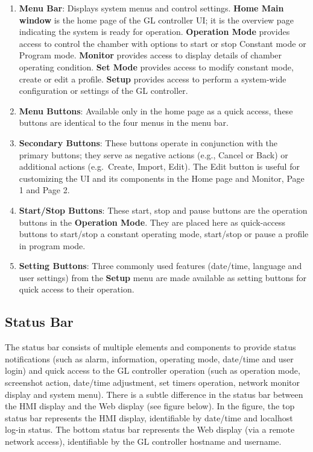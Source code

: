 \begin{enumerate}
\def\labelenumi{\arabic{enumi}.}
\tightlist
\item
  \textbf{Menu Bar}: Displays system menus and control settings.
  \textbf{Home Main window} is the home page of the GL controller UI; it
  is the overview page indicating the system is ready for operation.
  \textbf{Operation Mode} provides access to control the chamber with
  options to start or stop Constant mode or Program mode.
  \textbf{Monitor} provides access to display details of chamber
  operating condition. \textbf{Set Mode} provides access to modify
  constant mode, create or edit a profile. \textbf{Setup} provides
  access to perform a system-wide configuration or settings of the GL
  controller.\\
\item
  \textbf{Menu Buttons}: Available only in the home page as a quick
  access, these buttons are identical to the four menus in the menu
  bar.\\
\item
  \textbf{Secondary Buttons}: These buttons operate in conjunction with
  the primary buttons; they serve as negative actions (e.g., Cancel or
  Back) or additional actions (e.g.~Create, Import, Edit). The Edit
  button is useful for customizing the UI and its components in the Home
  page and Monitor, Page 1 and Page 2.
\item
  \textbf{Start/Stop Buttons}: These start, stop and pause buttons are
  the operation buttons in the \textbf{Operation Mode}. They are placed
  here as quick-access buttons to start/stop a constant operating mode,
  start/stop or pause a profile in program mode.\\
\item
  \textbf{Setting Buttons}: Three commonly used features (date/time,
  language and user settings) from the \textbf{Setup} menu are made
  available as setting buttons for quick access to their operation.
\end{enumerate}


\subsection{Status Bar}

The status bar consists of multiple elements and components to provide
status notifications (such as alarm, information, operating mode,
date/time and user login) and quick access to the GL controller
operation (such as operation mode, screenshot action, date/time
adjustment, set timers operation, network monitor display and system
menu). There is a subtle difference in the status bar between the HMI
display and the Web display (see figure below). In the figure, the top
status bar represents the HMI display, identifiable by date/time and
localhost log-in status. The bottom status bar represents the Web
display (via a remote network access), identifiable by the GL controller
hostname and username.

